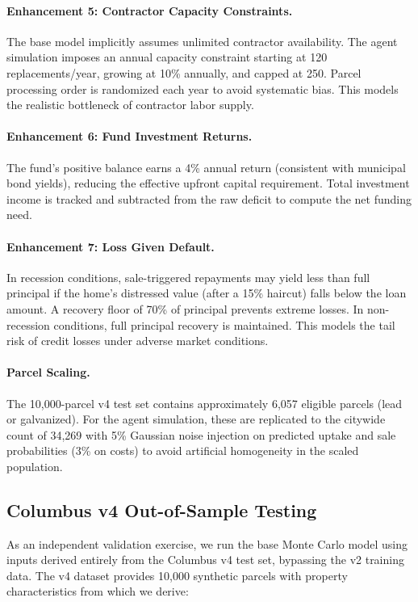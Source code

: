 \documentclass[11pt, letterpaper]{article}
\begin{document}
\paragraph{Enhancement 5: Contractor Capacity Constraints.} The base model implicitly assumes unlimited contractor availability. The agent simulation imposes an annual capacity constraint starting at 120 replacements/year, growing at 10\% annually, and capped at 250. Parcel processing order is randomized each year to avoid systematic bias. This models the realistic bottleneck of contractor labor supply.

\paragraph{Enhancement 6: Fund Investment Returns.} The fund's positive balance earns a 4\% annual return (consistent with municipal bond yields), reducing the effective upfront capital requirement. Total investment income is tracked and subtracted from the raw deficit to compute the net funding need.

\paragraph{Enhancement 7: Loss Given Default.} In recession conditions, sale-triggered repayments may yield less than full principal if the home's distressed value (after a 15\% haircut) falls below the loan amount. A recovery floor of 70\% of principal prevents extreme losses. In non-recession conditions, full principal recovery is maintained. This models the tail risk of credit losses under adverse market conditions.

\paragraph{Parcel Scaling.} The 10{,}000-parcel v4 test set contains approximately 6{,}057 eligible parcels (lead or galvanized). For the agent simulation, these are replicated to the citywide count of 34{,}269 with 5\% Gaussian noise injection on predicted uptake and sale probabilities (3\% on costs) to avoid artificial homogeneity in the scaled population.

\subsection{Columbus v4 Out-of-Sample Testing}

As an independent validation exercise, we run the base Monte Carlo model using inputs derived entirely from the Columbus v4 test set, bypassing the v2 training data. The v4 dataset provides 10{,}000 synthetic parcels with property characteristics from which we derive:
\end{document}
